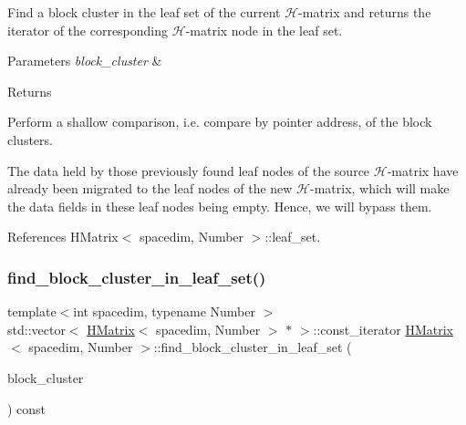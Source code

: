 Find a block cluster in the leaf set of the current $\mathcal{H}$-\/matrix and returns the iterator of the corresponding $\mathcal{H}$-\/matrix node in the leaf set.


\begin{DoxyParams}{Parameters}
{\em block\+\_\+cluster} & \\
\hline
\end{DoxyParams}
\begin{DoxyReturn}{Returns}

\end{DoxyReturn}
Perform a shallow comparison, i.\+e. compare by pointer address, of the block clusters.


\begin{DoxyDescription}
\item[Note ]The data held by those previously found leaf nodes of the source $\mathcal{H}$-\/matrix have already been migrated to the leaf nodes of the new $\mathcal{H}$-\/matrix, which will make the data fields in these leaf nodes being empty. Hence, we will bypass them. 
\end{DoxyDescription}

References H\+Matrix$<$ spacedim, Number $>$\+::leaf\+\_\+set.

\mbox{\label{classHMatrix_a723cc200afe31148fcc28f0120c5ec54}} 
\subsubsection{\texorpdfstring{find\+\_\+block\+\_\+cluster\+\_\+in\+\_\+leaf\+\_\+set()}{find\_block\_cluster\_in\_leaf\_set()}\hspace{0.1cm}{\footnotesize\ttfamily [2/2]}}
{\footnotesize\ttfamily template$<$int spacedim, typename Number $>$ \\
std\+::vector$<$ \hyperlink{classHMatrix}{H\+Matrix}$<$ spacedim, Number $>$ $\ast$ $>$\+::const\+\_\+iterator \hyperlink{classHMatrix}{H\+Matrix}$<$ spacedim, Number $>$\+::find\+\_\+block\+\_\+cluster\+\_\+in\+\_\+leaf\+\_\+set (\begin{DoxyParamCaption}\item[{const \hyperlink{classBlockCluster}{Block\+Cluster}$<$ spacedim, Number $>$ \&}]{block\+\_\+cluster }\end{DoxyParamCaption}) const}


